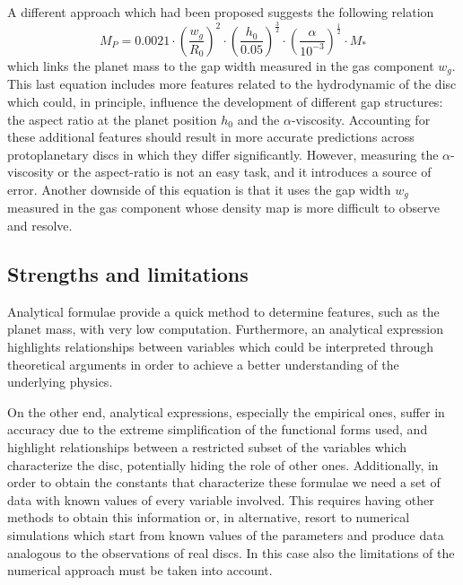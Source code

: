 \documentclass[a4paper,10pt]{report}
\begin{document}
A different approach which had been proposed \cite{kanagawa} suggests the following relation
\begin{equation}
    M_P = 0.0021 \cdot \left( \frac{w_g}{R_0}\right)^2
    \cdot \left(\frac{h_0}{0.05}\right)^{\frac 32}
    \cdot \left(\frac{\alpha}{10^{-3}}\right)^{\frac 12}
    \cdot M_*
\end{equation}
which links the planet mass to the gap width measured in the gas component $w_g$.
This last equation includes more features related to the hydrodynamic of the disc which could, in principle,
influence the development of different gap structures: the aspect ratio at the planet position
$h_0$ and the $\alpha$-viscosity. Accounting for these additional features should result in more accurate predictions
across protoplanetary discs in which they differ significantly. However, measuring the $\alpha$-viscosity or the aspect-ratio 
is not an easy task, and it introduces a source of error.
Another downside of this equation is that it uses the gap width $w_g$ measured in the gas component 
whose density map is more difficult to observe and resolve.

\subsection{Strengths and limitations}

Analytical formulae provide a quick method to determine features, such as the planet mass, with 
very low computation. Furthermore, an analytical expression highlights relationships between variables
which could be interpreted through theoretical arguments in order to achieve a better understanding 
of the underlying physics.

On the other end, analytical expressions, especially the empirical ones, suffer in accuracy due to 
the extreme simplification of the functional forms used, and highlight relationships between a restricted subset of
the variables which characterize the disc, potentially hiding the role of other ones.
Additionally, in order to obtain the constants that characterize these formulae we need a set of
data with known values of every variable involved. This requires having other methods to obtain this information
or, in alternative, resort to numerical simulations which start from known values of the parameters and produce
data analogous to the observations of real discs. In this case also the limitations of the numerical approach must be taken 
into account.

\end{document}
